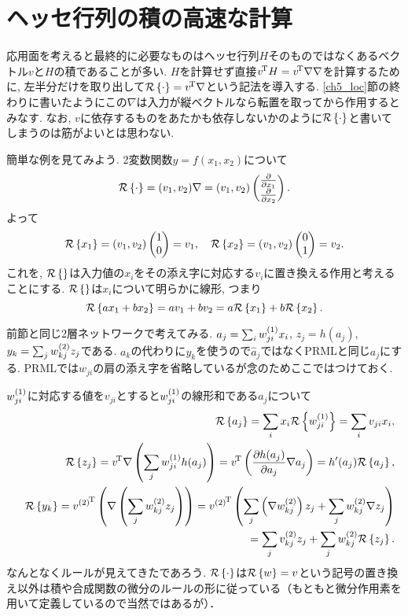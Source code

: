 \section{ヘッセ行列の積の高速な計算}
応用面を考えると最終的に必要なものはヘッセ行列$H$そのものではなくあるベクトル$v$と$H$の積であることが多い.
$H$を計算せず直接${v}^{\!\mathrm{T}}H={v}^{\!\mathrm{T}}\nabla \nabla$を計算するために, 左半分だけを取り出して${\cal R}\left\{\cdot \right\}={v}^{\!\mathrm{T}}\nabla$という記法を導入する.
\ref{ch5_loc}節の終わりに書いたようにこの$\nabla$は入力が縦ベクトルなら転置を取ってから作用するとみなす.
なお, $v$に依存するものをあたかも依存しないかのように${\cal R}\left\{\cdot \right\}$と書いてしまうのは筋がよいとは思わない.

簡単な例を見てみよう. 2変数関数$y=f(x_1, x_2)$について
$$
{\cal R}\left\{\cdot \right\}=(v_1,v_2)\nabla = (v_1,v_2)\begin{pmatrix} \frac{\partial}{\partial x_1} \\ \frac{\partial}{\partial x_2} \end{pmatrix}.
$$
よって
\begin{eqnarray*}
{\cal R}\left\{x_1 \right\}=(v_1,v_2)\begin{pmatrix} 1 \\ 0 \end{pmatrix}=v_1,\quad
{\cal R}\left\{x_2 \right\}=(v_1,v_2)\begin{pmatrix} 0 \\ 1 \end{pmatrix}=v_2.
\end{eqnarray*}
これを, ${\cal R}\left\{ \right\}$は入力値の$x_i$をその添え字に対応する$v_i$に置き換える作用と考えることにする.
${\cal R}\left\{ \right\}$は$x_i$について明らかに線形, つまり
$$
{\cal R}\left\{ax_1+bx_2 \right\}=a v_1 + b v_2 = a{\cal R}\left\{x_1 \right\}+b{\cal R}\left\{x_2 \right\}.
$$

前節と同じ2層ネットワークで考えてみる.
$a_j=\sum_i w_{ji}^{(1)}x_i$, $z_j=h(a_j)$, $y_k=\sum_j w_{kj}^{(2)} z_j$である.
$a_k$の代わりに$y_k$を使うので$\hat{a}_j$ではなくPRMLと同じ$a_j$にする.
PRMLでは$w_{ji}$の肩の添え字を省略しているが念のためここではつけておく.

$w_{ji}^{(1)}$に対応する値を$v_{ji}$とすると$w_{ji}^{(1)}$の線形和である$a_j$について
\begin{eqnarray*}&&
\calRR{a_j} = \sum_i x_i \calRR{\ww{ji}{1}} = \sum_i v_{ji} x_i,
\\&&
\calRR{z_j} = \trans{v}\nabla \left(\sum_j \ww{ji}{1} h(a_j)\right)
 = \trans{v}\left(\diff{a_j}{h(a_j)} \nabla a_j\right)=h'(a_j)\calRR{a_j},
\\&&
\calRR{y_k}
 = \trans{v^{(2)}{}}\left(\nabla \left(\sum_j \ww{kj}{2}z_j\right)\right)
 = \trans{v^{(2)}{}}\left(\sum_j \left(
     \nabla \ww{kj}{2}\right)z_j+\sum_j \ww{kj}{2}\nabla z_j
   \right)
\\&&\phantom{\calRR{y_k}}
 = \sum_j v_{kj}^{(2)} z_j+\sum_j\ww{kj}{2}\calRR{z_j}.
\end{eqnarray*}
なんとなくルールが見えてきたであろう.
${\cal R}\left\{\cdot \right\}$は${\cal R}\left\{w \right\}=v$という記号の置き換え以外は積や合成関数の微分のルールの形に従っている（もともと微分作用素を用いて定義しているので当然ではあるが）．

